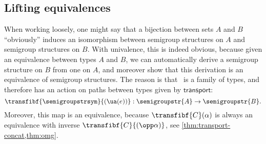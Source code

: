 \subsection{Lifting equivalences}

%
When working loosely, one might say that a bijection between sets $A$
and $B$ ``obviously'' induces an isomorphism between semigroup
structures on $A$ and semigroup structures on $B$.  With univalence,
this is indeed obvious, because given an equivalence between types $A$
and $B$, we can automatically derive a semigroup structure on $B$ from
one on $A$, and moreover show that this derivation is an equivalence of
semigroup structures.  The reason is that \semigroupstrsym\ is a family
of types, and therefore has an action on paths between types given by
$\mathsf{transport}$:
\[
\transfibf{\semigroupstrsym}{(\ua(e))} : \semigroupstr{A} \to \semigroupstr{B}.
\]
Moreover, this map is an equivalence, because
$\transfibf{C}(\alpha)$ is always an equivalence with inverse
$\transfibf{C}{(\opp \alpha)}$, see \cref{thm:transport-concat,thm:omg}.

